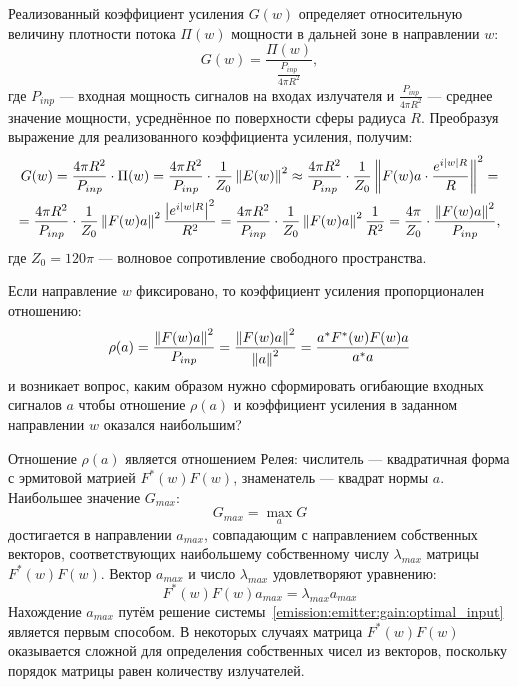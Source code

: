 Реализованный коэффициент усиления $G(w)$ определяет относительную величину плотности потока $\Pi(w)$ мощности в дальней зоне в
направлении $w$:
\[
    G(w)
    = \frac{\Pi(w)}{\frac{P_{inp}}{4 \pi R^2}},
\]
где $P_{inp}$ --- входная мощность сигналов на входах излучателя и $\frac{P_{inp}}{4 \pi R^2}$ --- среднее значение мощности,
усреднённое по поверхности сферы радиуса $R$. Преобразуя выражение для реализованного коэффициента усиления, получим:
\begin{multline}
    G(w)
    = \frac{4 \pi R^2}{P_{inp}} \cdot \Pi(w)
    = \frac{4 \pi R^2}{P_{inp}} \cdot \frac{1}{Z_0} \left \| E(w) \right \|^2
    \approx \frac{4 \pi R^2}{P_{inp}} \cdot \frac{1}{Z_0} \left \| F(w) a \cdot \frac{e^{i \left | w \right | R}}{R} \right \|^2 = \\
    = \frac{4 \pi R^2}{P_{inp}} \cdot \frac{1}{Z_0} \left \| F(w) a \right \|^2 \frac{\left | e^{i \left | w \right | R} \right |^2}{R^2}
    = \frac{4 \pi R^2}{P_{inp}} \cdot \frac{1}{Z_0} \left \| F(w) a \right \|^2 \frac{1}{R^2}
    = \frac{4 \pi}{Z_0} \cdot \frac{\left \| F(w) a \right \|^2}{P_{inp}} ,
\end{multline}
где $Z_0 = 120 \pi$ --- волновое сопротивление свободного пространства.

Если направление $w$ фиксировано, то коэффициент усиления пропорционален отношению:
\begin{equation}
    \label{emission:emitter:gain:rayleigh}
    \rho(a)
    = \frac{\left \| F(w) a \right \|^2}{P_{inp}}
    = \frac{\left \| F(w) a \right \|^2}{\left \| a \right \|^2}
    = \frac{a^* F^*(w) F(w) a}{a^* a}
\end{equation}
и возникает вопрос, каким образом нужно сформировать огибающие входных сигналов $a$ чтобы отношение $\rho(a)$ и коэффициент усиления в заданном направлении $w$
оказался наибольшим?

Отношение $\rho(a)$ является отношением Релея: числитель --- квадратичная форма с эрмитовой матрией $F^*(w) F(w)$, знаменатель --- квадрат нормы $a$.
Наибольшее значение $G_{max}$:
\[
    G_{max} = \max \limits_{a} G
\]
достигается в направлении $a_{max}$, совпадающим с направлением собственных векторов, соответствующих наибольшему собственному числу $\lambda_{max}$ матрицы $F^*(w)F(w)$.
Вектор $a_{max}$ и число $\lambda_{max}$ удовлетворяют уравнению:
\begin{equation}
    \label{emission:emitter:gain:optimal_input}
    F^*(w) F(w) a_{max} = \lambda_{max} a_{max}
\end{equation}
Нахождение $a_{max}$ путём решение системы~\eqref{emission:emitter:gain:optimal_input} является первым способом. В некоторых случаях матрица $F^*(w)F(w)$ оказывается сложной
для определения собственных чисел из векторов, поскольку порядок матрицы равен количеству излучателей.

